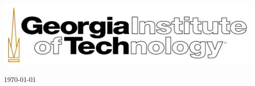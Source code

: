 \documentclass[11pt]{article}
\begin{document}
\begin{titlepage}
	
	
	\vfill\vfill %
	
	
	\vfill\vfill
	\includegraphics[scale=0.1]{pictures/gatech-logo.png}\\%
	 
	
	\vfill\vfill\vfill\vfill\vfill\vfill\vfill %
	
	{\large\today} %
	
\end{titlepage}
\end{document}
